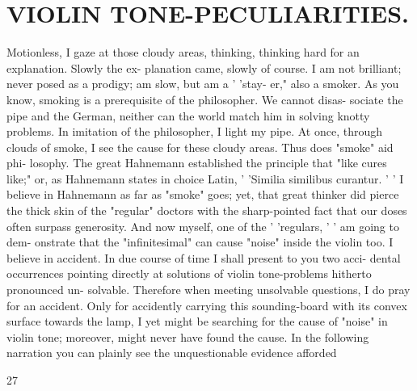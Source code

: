 \documentclass{article}
\begin{document}
\section*{VIOLIN TONE-PECULIARITIES.}
Motionless, I gaze at those cloudy areas, thinking, thinking hard for an explanation. Slowly the ex- planation came, slowly of course. I am not brilliant; never posed as a prodigy; am slow, but am a ' 'stay- er," also a smoker. As you know, smoking is a prerequisite of the philosopher. We cannot disas- sociate the pipe and the German, neither can the world match him in solving knotty problems. In imitation of the philosopher, I light my pipe. At once, through clouds of smoke, I see the cause for these cloudy areas. Thus does "smoke" aid phi- losophy. The great Hahnemann established the principle that "like cures like;" or, as Hahnemann states in choice Latin, ' 'Similia similibus curantur. ' ' I believe in Hahnemann as far as "smoke" goes; yet, that great thinker did pierce the thick skin of the "regular" doctors with the sharp-pointed fact that our doses often surpass generosity. And now myself, one of the ' 'regulars, ' ' am going to dem- onstrate that the "infinitesimal" can cause "noise" inside the violin too. I believe in accident. In due course of time I shall present to you two acci- dental occurrences pointing directly at solutions of violin tone-problems hitherto pronounced un- solvable. Therefore when meeting unsolvable questions, I do pray for an accident. Only for accidently carrying this sounding-board with its convex surface towards the lamp, I yet might be searching for the cause of "noise" in violin tone; moreover, might never have found the cause. In the following narration you can plainly see the unquestionable evidence afforded

27
\end{document}
